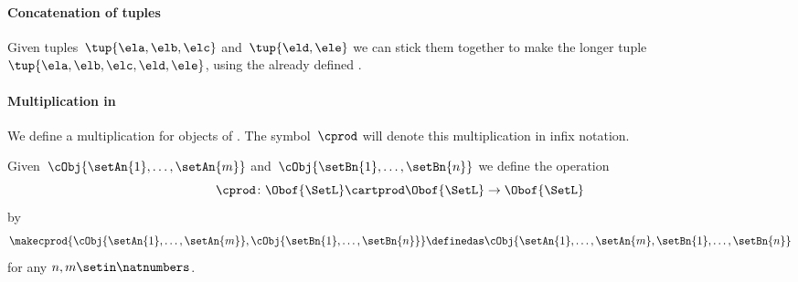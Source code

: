 \paragraph{Concatenation of tuples}

Given tuples~$\tup{\ela, \elb, \elc}$ and~$\tup{\eld, \ele}$ we can stick them together to make the longer tuple~$\tup{\ela, \elb, \elc, \eld, \ele}$, using the already defined .


\paragraph{Multiplication in \SetL}
\label{sec:multiplication-for-SetL}
We define a multiplication for objects of \SetL.
The symbol~$\cprod$ will denote this multiplication in infix notation.

Given~$\cObj{\setAn{1}, \ldots, \setAn{m}}$ and~$\cObj{\setBn{1}, \ldots, \setBn{n}}$ we define the operation
\begin{equation}
    \label{eq:mult-setl-sign}
    \cprod \colon \Obof{\SetL} \cartprod \Obof{\SetL} \to \Obof{\SetL}
\end{equation}
by
\begin{equation}
    \label{eq:strict-monoidal-product-sets}
    \makecprod{
        \cObj{\setAn{1}, \ldots, \setAn{m}},
        \cObj{\setBn{1}, \ldots, \setBn{n}}
    } \definedas \cObj{\setAn{1}, \ldots, \setAn{m}, \setBn{1}, \ldots, \setBn{n}}
\end{equation}
for any $n, m \setin \natnumbers$.

